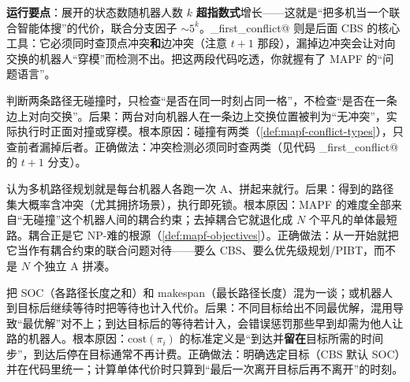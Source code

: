 \textbf{运行要点}：展开的状态数随机器人数 $k$ \textbf{超指数式}增长——这就是“把多机当一个联合智能体搜”的代价，联合分支因子 $\sim 5^k$。\verb@find_first_conflict@ 则是后面 CBS 的核心工具：它必须同时查顶点冲突\textbf{和}边冲突（注意 $t{+}1$ 那段），漏掉边冲突会让对向交换的机器人“穿模”而检测不出。把这两段代码吃透，你就握有了 MAPF 的“问题语言”。

\begin{pitfall}
判断两条路径无碰撞时，只检查“是否在同一时刻占同一格”，不检查“是否在一条边上对向交换”。后果：两台对向机器人在一条边上交换位置被判为“无冲突”，实际执行时正面对撞或穿模。根本原因：碰撞有两类（\cref{def:mapf-conflict-types}），只查前者漏掉后者。正确做法：冲突检测必须同时查两类（见代码 \verb@find_first_conflict@ 的 $t{+}1$ 分支）。
\end{pitfall}

\begin{pitfall}
认为多机路径规划就是每台机器人各跑一次 A\*、拼起来就行。后果：得到的路径集大概率含冲突（尤其拥挤场景），执行即死锁。根本原因：MAPF 的难度全部来自“无碰撞”这个机器人间的耦合约束；去掉耦合它就退化成 $N$ 个平凡的单体最短路。耦合正是它 NP-难的根源（\cref{def:mapf-objectives}）。正确做法：从一开始就把它当作有耦合约束的联合问题对待——要么 CBS、要么优先级规划/PIBT，而不是 $N$ 个独立 A\* 拼凑。
\end{pitfall}

\begin{pitfall}
把 SOC（各路径长度之和）和 makespan（最长路径长度）混为一谈；或机器人到目标后继续等待时把等待也计入代价。后果：不同目标给出不同最优解，混用导致“最优解”对不上；到达目标后的等待若计入，会错误惩罚那些早到却需为他人让路的机器人。根本原因：$\mathrm{cost}(\pi_i)$ 的标准定义是“到达并\textbf{留在}目标所需的时间步”，到达后停在目标通常不再计费。正确做法：明确选定目标（CBS 默认 SOC）并在代码里统一；计算单体代价时只算到“最后一次离开目标后再不离开”的时刻。
\end{pitfall}

